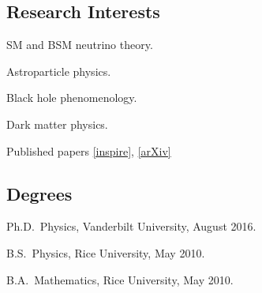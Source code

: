 \documentclass{article}
\renewenvironment{itemize}{
\begin{list}{}{
\setlength{\leftmargin}{.5em}}}{
\end{list}}
\begin{document}
\subsection*{Research Interests}
\begin{itemize}
\item SM and BSM neutrino theory.
\item Astroparticle physics.
\item Black hole phenomenology.
\item Dark matter physics.
\end{itemize}
Published papers \href{https://inspirehep.net/authors/1272961}{[inspire]}, \href{https://arxiv.org/search/?searchtype=author&query=Denton\%2C+P+B}{[arXiv]}

\subsection*{Degrees}
\begin{itemize}
\item Ph.D.~Physics, Vanderbilt University, August 2016.
\item B.S.~Physics, Rice University, May 2010.
\item B.A.~Mathematics, Rice University, May 2010.
\end{itemize}
\end{document}
